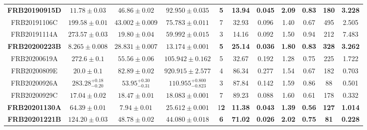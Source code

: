 \begin{table*}
\begin{tabular}{c c c c c c c c c c c}
        \textbf{FRB20190915D} & $\mathbf{11.78 \pm 0.03}$ & $\mathbf{46.86 \pm 0.02}$ & $\mathbf{92.950 \pm 0.035}$ & \textbf{5} & \textbf{13.94} & \textbf{0.045} & \textbf{2.09} & \textbf{0.83} & \textbf{180} & \textbf{3.228}\\
        FRB20191106C & $199.58 \pm 0.01$ & $43.002 \pm 0.009$ & $75.783\pm 0.011$ & 7 & 32.93 & 0.096 & 1.40 & 0.67 & 495 & 2.505\\
        FRB20191114A & $273.57 \pm 0.03$ & $19.80 \pm 0.04$ & $59.992 \pm 0.015$ & 3 & 14.16 & 0.092 & 1.50 & 0.94 & 212 & 7.483\\
        \textbf{FRB20200223B} & $\mathbf{8.265 \pm 0.008}$ & $\mathbf{28.831 \pm 0.007}$ & $\mathbf{13.174 \pm 0.001}$ & \textbf{5} & \textbf{25.14}&\textbf{0.036}&\textbf{1.80}&\textbf{0.83}&\textbf{328}&\textbf{3.262}\\
        FRB20200619A & $272.6 \pm 0.1$ & $55.56 \pm 0.06 $ & $105.942 \pm 0.162$ & 5 & 32.67&0.192&1.28&0.75&225&1.722\\
        FRB20200809E & $20.0 \pm 0.1$ & $82.89 \pm 0.02$ & $920.915 \pm 2.577$ & 4 & 86.34 & 0.277 & 1.54 & 0.67 & 182 & 0.703\\
        FRB20200926A & $283.28^{+0.18}_{-0.20}$ & $53.95^{+0.30}_{-0.31}$ & $110.955^{+0.800}_{-0.823}$ & 3 & 87.84 & 0.142 & 1.59 & 0.86 & 88 & 0.501\\
        FRB20200929C & $17.04 \pm 0.02$ & $18.47 \pm 0.01$ & $18.083 \pm 0.001$ & 7 & 89.23 & 0.088 & 1.60 & 0.61 & 178 & 0.332\\
        \textbf{FRB20201130A} & $\mathbf{64.39 \pm 0.01}$ & $\mathbf{7.94 \pm 0.01}$ & $\mathbf{25.612 \pm 0.001}$ & 1\textbf{2}  & \textbf{11.38} & \textbf{0.043} & \textbf{1.39} & \textbf{0.56} & \textbf{127} & \textbf{1.014}\\
        \textbf{FRB20201221B} & $\mathbf{124.20 \pm 0.03}$ & $\mathbf{48.78 \pm 0.02}$ & $\mathbf{44.080 \pm 0.018}$ & \textbf{6} & \textbf{71.02} & \textbf{0.026} & \textbf{2.02} & \textbf{0.75} & \textbf{81} & \textbf{0.228}\\
    \hline
\end{tabular}\label{table:result}
\end{table*}